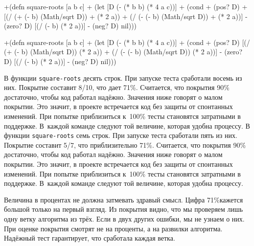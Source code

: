 \begin{english}
  \begin{diff}
+(defn square-roots [a b c]
+  (let [D (- (* b b) (* 4 a c))]
+    (cond
+      (pos? D)
+      [(/ (+ (- b) (Math/sqrt D))
+          (* 2 a))
+       (/ (- (- b) (Math/sqrt D))
+          (* 2 a))]
-      (zero? D) [(/ (- b) (* 2 a))]
-      (neg? D) nil)))
  \end{diff}
\end{english}

\else

\begin{english}
  \begin{diff}
+(defn square-roots [a b c]
+  (let [D (- (* b b) (* 4 a c))]
+    (cond
+      (pos? D) [(/ (+ (- b) (Math/sqrt D)) (* 2 a))
+                (/ (- (- b) (Math/sqrt D)) (* 2 a))]
-      (zero? D) [(/ (- b) (* 2 a))]
-      (neg? D) nil)))
  \end{diff}
\end{english}
\fi

\ifx\DEVICETYPE\MOBILE

\def\covperc{80\%}

\else

\def\covperc{71\%}

\fi

\ifx\DEVICETYPE\MOBILE
В функции \verb|square-roots| десять строк. При запуске теста сработали восемь из
них. Покрытие составит 8/10, что дает \covperc. Считается, что покрытия
90\% достаточно, чтобы код работал надёжно. Значения ниже говорят о малом
покрытии. Это значит, в проекте встречается код без защиты от спонтанных
изменений. При попытке приблизиться к~100\% тесты становятся затратными в
поддержке. В~каждой команде следуют той величине, которая удобна процессу.
\else
В функции \verb|square-roots| семь строк. При запуске теста сработали пять из
них. Покрытие составит 5/7, что приблизительно \covperc. Считается, что покрытия
90\% достаточно, чтобы код работал надёжно. Значения ниже говорят о малом
покрытии. Это значит, в проекте встречается код без защиты от спонтанных
изменений. При попытке приблизиться к~100\% тесты становятся затратными в
поддержке. В~каждой команде следуют той величине, которая удобна процессу.
\fi

Величина в процентах не должна затмевать здравый смысл. Цифра \covperc кажется
большой только на первый взгляд. Из покрытия видно, что мы проверяем лишь одну
ветку алгоритма из трёх. Если в двух других ошибки, мы не узнаем о них. При
оценке покрытия смотрят не на проценты, а на развилки алгоритма. Надёжный тест
гарантирует, что сработала каждая ветка.

